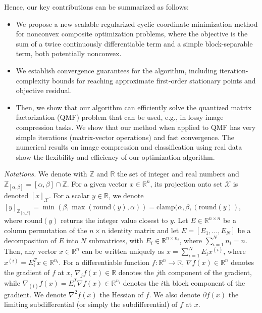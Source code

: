 \documentclass[lettersize,journal]{IEEEtran}
\begin{document}
\medskip

\noindent Hence, our key contributions can be summarized as follows:
\begin{itemize}
    \item We propose a new scalable regularized cyclic coordinate minimization method for nonconvex composite optimization problems, where the objective is the sum of a twice continuously differentiable term and a simple block-separable term, both potentially nonconvex.
    \item We establish convergence guarantees for the algorithm, including iteration-complexity bounds for reaching approximate first-order stationary points and objective residual.
    \item Then, we show that our algorithm can efficiently  solve the quantized matrix factorization (QMF) problem that can be used, e.g.,  in lossy image compression tasks. We show that our method when applied to QMF  has very simple iterations (matrix-vector operations) and fast convergence. The numerical results on image compression and classification using real data show the flexibility and  efficiency of our optimization  algorithm.      
\end{itemize}

\medskip

\noindent \textit{Notations.}
We denote with $\mathbb{Z}$ and  $\mathbb{R}$ the set of integer and real numbers and $\mathbb{Z}_{[\alpha, \beta]} = [\alpha, \beta] \cap \mathbb{Z}$. For a given vector $x \in \mathbb{R}^n$, its projection  onto set $\mathcal{X}$ is denoted $[x]_{\mathcal{X}}$. For a scalar $y \in \mathbb{R}$, we denote  $[y]_{\mathbb{Z}_{[\alpha, \beta]}} = \min(\beta, \max(\text{round}(y),\alpha)) = \text{clamp}(\alpha, \beta,(\text{round}(y))$, where $\text{round}(y)$ returns the integer value closest to $y$. Let $E \in \mathbb{R}^{n \times n}$ be  a column permutation of the $n \times n$ identity matrix and  let $E = [E_{1},...,E_{N}]$ be a decomposition of $E$ into $N$ submatrices, with $E_{i} \in \mathbb{R}^{n \times n_{i}}$, where $\sum_{i = 1}^{N}n_{i} = n$. Then, any vector $x \in \mathbb{R}^n$ can be written uniquely as $x = \sum_{i = 1}^{N} E_{i} x^{(i)}$, where $x^{(i)} = E_{i}^{T}x \in \mathbb{R}^{n_{i}}$. For a differentiable function $f :  \mathbb{R}^{n} \to  \mathbb{R}$, $\nabla f(x) \in \mathbb{R}^{n}$ denotes the gradient of $f$ at $x$, $\nabla_{j} f(x) \in \mathbb{R}$ denotes the $j$th component of the gradient, while $\nabla_{(i)} f(x) = E_i^T \nabla f(x) \in \mathbb{R}^{n_{i}}$ denotes the $i$th block component of the gradient. We denote $\nabla^2 f(x)$  the Hessian of $f$. We also denote $\partial f(x)$ the limiting subdifferential (or simply the subdifferential) of $f$ at $x$.  
\end{document}
